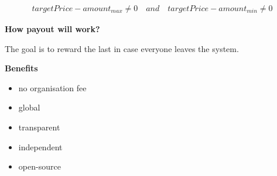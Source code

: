 \begin{eqnarray}
targetPrice - amount_{max} \neq 0 \quad and \quad targetPrice - amount_{min} \neq 0
\end{eqnarray}

\textbf{How payout will work?}

The goal is to reward the last in case everyone leaves the system.
\newline\newline

\textbf{Benefits}

\begin{itemize}
\item no organisation fee 
\item global
\item transparent
\item independent
\item open-source
\end{itemize}
